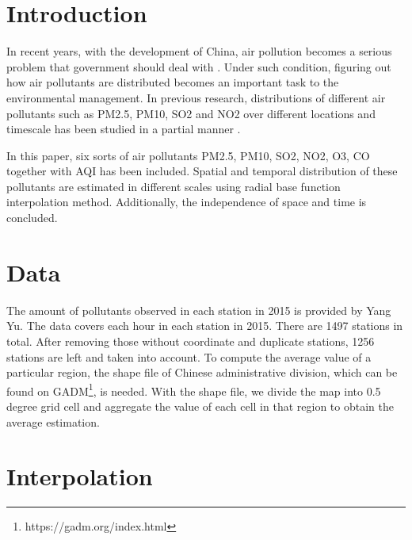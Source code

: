 \documentclass[letterpaper]{article}
\begin{document}
%
\title{}
\author{}
\maketitle
\begin{abstract}
\begin{quote}
\end{quote}
\end{abstract}


\begin{CJK*}{UTF8}{gkai}
\section{Introduction}
In recent years, with the development of China, air pollution becomes a serious problem that government should deal with . Under such condition, figuring out how air pollutants are distributed becomes an important task to the environmental management. In previous research, distributions of different air pollutants such as PM2.5, PM10, SO2 and NO2 over different locations and timescale has been studied in a partial manner .

In this paper, six sorts of air pollutants PM2.5, PM10, SO2, NO2, O3, CO together with AQI has been included. Spatial and temporal distribution of these pollutants are estimated in different scales using radial base function interpolation method. Additionally, the independence of space and time is concluded. 

\section{Data}

The amount of pollutants observed in each station in 2015 is provided by Yang Yu. The data covers each hour in each station in 2015. There are 1497 stations in total. After removing those without coordinate and duplicate stations, 1256 stations are left and taken into account. To compute the average value of a particular region, the shape file of Chinese administrative division, which can be found on GADM\footnote{https://gadm.org/index.html}, is needed. With the shape file, we divide the map into 0.5 degree grid cell and aggregate the value of each cell in that region to obtain the average estimation.

\section{Interpolation}


\end{CJK*}
\end{document}
